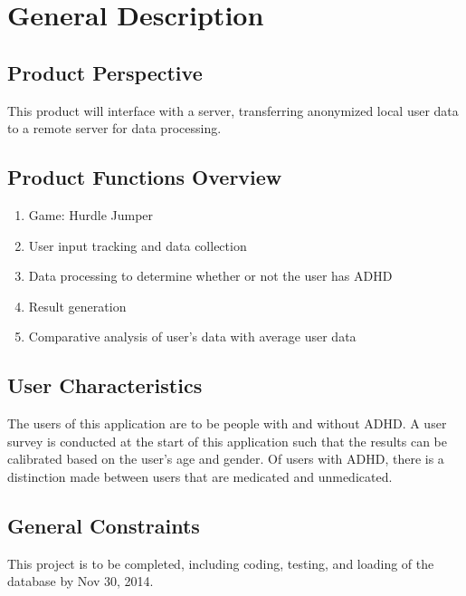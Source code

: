 \documentclass[a4wide]{article}
\begin{document}

\section{General Description}

\subsection{Product Perspective}

This product will interface with a server, transferring anonymized local user data to a remote server for data processing.


\subsection{Product Functions Overview}

\begin{enumerate}
\item Game: Hurdle Jumper
\item User input tracking and data collection
\item Data processing to determine whether or not the user has ADHD
\item Result generation
\item Comparative analysis of user's data with average user data
\end{enumerate}

\subsection{User Characteristics}

The users of this application are to be people with and without ADHD. A user survey is conducted at the start of this application such that the results can be calibrated based on the user's age and gender. Of users with ADHD, there is a distinction made between users that are medicated and unmedicated.

\subsection{General Constraints}

This project is to be completed, including coding, testing, and loading of the database by Nov 30, 2014.

\end{document}
